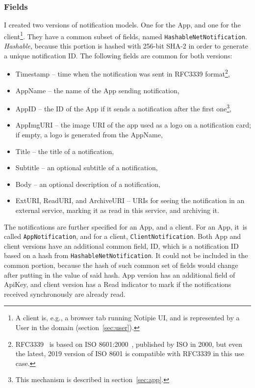 \subsubsection{Fields}\label{sec:protocol-fields}

I created two versions of notification models.
One for the App,
and one for the client\footnote{
  A client is, e.g.,
  a browser tab running Notipie \ac{UI},
  and is represented
  by a User in the domain (section~\ref{sec:user}).
}.
They have a common subset of fields,
named \texttt{HashableNetNotification}.
\textit{Hashable},
because this portion is hashed with 256-bit \ac{SHA-2}
in order to generate a unique notification \ac{ID}.
The following fields are common for both versions:

\begin{itemize}
  \item Timestamp -- time when the notification was sent
        in RFC3339 format\footnote{
          RFC3339~\cite{clyne_rfc3339_2002} is based on
          ISO 8601:2000~\cite{international_organization_for_standardization_iso_2000},
          published by \ac{ISO} in 2000,
          but even the latest, 2019 version of ISO 8601
          is compatible with RFC3339 in this use case.
        },
  \item AppName -- the name of the App sending notification,
  \item AppID -- the \ac{ID} of the App
        if it sends a notification after the first one\footnote{
          This mechanism is described in section~\ref{sec:app}.
        },
  \item AppImgURI -- the image \ac{URI} of the app
        used as a logo on a notification card;
        if empty, a logo is generated from the AppName,
  \item Title -- the title of a notification,
  \item Subtitle -- an optional subtitle of a notification,
  \item Body -- an optional description of a notification,
  \item ExtURI, ReadURI, and ArchiveURI -- \acp{URI}
        for seeing the notification in an external service,
        marking it as read in this service, and archiving it.
\end{itemize}

The notifications are further specified
for an App, and a client.
For an App, it~is called \texttt{AppNotification},
and for a client, \texttt{ClientNotification}.
Both App and client versions
have an additional common field, \ac{ID},
which is a notification \ac{ID}
based on a hash from \texttt{HashableNetNotification}.
It could not be included in the common portion,
because the hash of such common set of fields
would change after putting in the value of said hash.
App version has an additional field of ApiKey,
and client version has a Read indicator
to mark if the notifications received
synchronously are already read.
